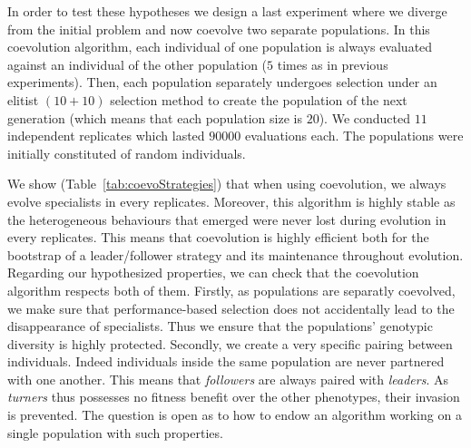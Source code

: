   In order to test these hypotheses we design a last experiment where we diverge from the initial problem and now coevolve two separate populations. In this coevolution algorithm, each individual of one population is always evaluated against an individual of the other population ($5$ times as in previous experiments). Then, each population separately undergoes selection under an elitist \((10+10)\) selection method to create the population of the next generation (which means that each population size is $20$). We conducted $11$ independent replicates which lasted $90000$ evaluations each. The populations were initially constituted of random individuals.

  \begin{table}[ht]
    \caption{\textbf{Strategies evolved by the best individuals when coevolving two populations.} Repartition of the different strategies adopted bt the best individuals at the last evaluation in each of the $11$ replicates. We indicate in each cell the number of simulations where a particular strategy evolved. Two populations were coevolved under elitist selection and the individuals' genotype values were initially random. In the table "L/F" stands for leader/follower and "NC" for "Non-Cooperative".}
    \label{tab:coevoStrategies}
  \end{table}

  We show (Table~\ref{tab:coevoStrategies}) that when using coevolution, we always evolve specialists in every replicates. Moreover, this algorithm is highly stable as the heterogeneous behaviours that emerged were never lost during evolution in every replicates. This means that coevolution is highly efficient both for the bootstrap of a leader/follower strategy and its maintenance throughout evolution. Regarding our hypothesized properties, we can check that the coevolution algorithm respects both of them. Firstly, as populations are separatly coevolved, we make sure that performance-based selection does not accidentally lead to the disappearance of specialists. Thus we ensure that the populations' genotypic diversity is highly protected. Secondly, we create a very specific pairing between individuals. Indeed individuals inside the same population are never partnered with one another. This means that \emph{followers} are always paired with \emph{leaders}. As \emph{turners} thus possesses no fitness benefit over the other phenotypes, their invasion is prevented. The question is open as to how to endow an algorithm working on a single population with such properties.


